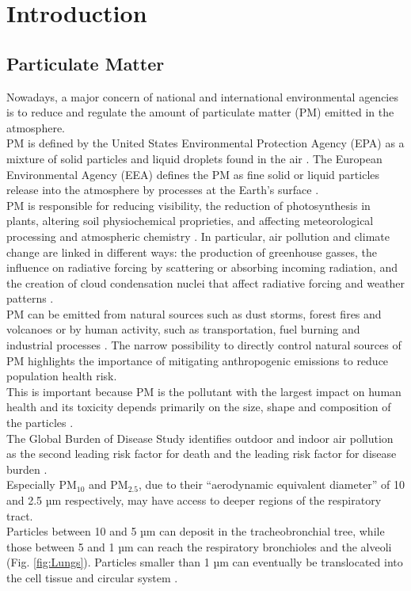 \chapter{Introduction}

\section{Particulate Matter}

Nowadays, a major concern of national and international environmental agencies is to reduce and regulate the amount of particulate matter (PM) emitted in the atmosphere. \\
PM is defined by the United States Environmental Protection Agency (EPA) as a mixture of solid particles and liquid droplets found in the air \cite{epaHealthEnvironmental}. The European Environmental Agency (EEA) defines the PM as fine solid or liquid particles release into the atmosphere by processes at the Earth’s surface \cite{europaPollution}. \\
PM is responsible for reducing visibility, the reduction of photosynthesis in plants, altering soil physiochemical proprieties, and affecting meteorological processing and atmospheric chemistry \cite{mukherjee2017world}. In particular, air pollution and climate change are linked in different ways: the production of greenhouse gasses, the influence on radiative forcing by scattering or absorbing incoming radiation, and the creation of cloud condensation nuclei that affect radiative forcing and weather patterns \cite{von2015chemistry}. \\
PM can be emitted from natural sources such as dust storms, forest fires and volcanoes or by human activity, such as transportation, fuel burning and industrial processes \cite{thangavel2022recent}.
The narrow possibility to directly control natural sources of PM highlights the importance of mitigating anthropogenic emissions to reduce population health risk. \\
This is important because PM is the pollutant with the largest impact on human health \cite{harrison2020airborne} and its toxicity depends primarily on the size, shape and composition of the particles \cite{mukherjee2017world}. \\
The Global Burden of Disease Study identifies outdoor and indoor air pollution as the second leading risk factor for death and the leading risk factor for disease burden \cite{ourworldindataDeathsFrom}. \\
Especially $\text{PM}_{10}$ and $\text{PM}_{2.5}$, due to their “aerodynamic equivalent diameter” of 10 and 2.5 µm respectively, may have access to deeper regions of the respiratory tract. \\
Particles between 10 and 5 µm can deposit in the tracheobronchial tree, while those between 5 and 1 µm can reach the respiratory bronchioles and the alveoli (Fig. \ref{fig:Lungs}). Particles smaller than 1 µm can eventually be translocated into the cell tissue and circular system \cite{kim2015review}.


